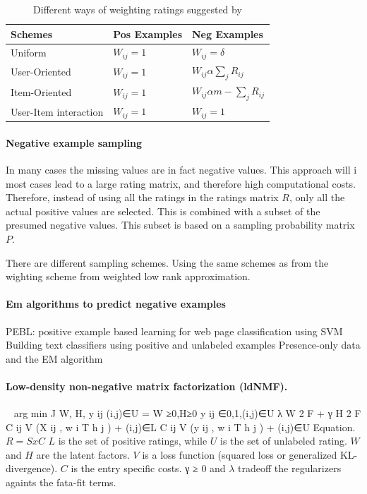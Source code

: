 \begin{table}[H]
    \centering
    \begin{tabular}{l|l|l}
      \textbf{Schemes}      & \textbf{Pos Examples} & \textbf{Neg Examples} \\ \hline
      Uniform               & $W_{ij} = 1$ & $W_{ij} = δ$ \\ \hline
      User-Oriented         & $W_{ij} = 1$ & $W_{ij} \alpha \sum_{j} R_{ij}$ \\ \hline
      Item-Oriented         & $W_{ij} = 1$ & $W_{ij} \alpha m - \sum_{j} R_{ij}$ \\ \hline
      User-Item interaction & $W_{ij} = 1$ & $W_{ij} = 1$  \\
    \end{tabular}
    \label{table:WeightingSchemes}
    \caption[Weighting Schemes]{Different ways of weighting ratings suggested by}
\end{table}

\paragraph{Negative example sampling }%
In many cases the missing values are in fact negative values.
This approach will i most cases lead to a large rating matrix, and therefore high computational costs.
Therefore, instead of using all the ratings in the ratings matrix $R$, only all the actual positive values are selected.
This is combined with a subset of the presumed negative values.
This subset is based on a sampling probability matrix $P$.

There are different sampling schemes.
Using the same schemes as from the wighting scheme from weighted low rank approximation.

\paragraph{Em algorithms to predict negative examples} %
PEBL: positive example based learning for web page classification using SVM
Building text classifiers using positive and unlabeled examples
Presence-only data and the EM algorithm

\paragraph{Low-density non-negative matrix factorization (ldNMF).}~%
arg min
J W, H, {y ij } (i,j)∈U =
W ≥0,H≥0
y ij ∈{0,1},(i,j)∈U
λ W
2
F
+ γ H
2
F
C ij V (X ij , w i T h j )
+
(i,j)∈L
C ij V (y ij , w i T h j )
+
(i,j)∈U
Equation.
$R = SxC$ %
$L$ is the set of positive ratings, while $U$ is the set of unlabeled rating.
$W$ and $H$ are the latent factors.
$V$ is a loss function (squared loss or generalized KL-divergence).
$C$ is the entry specific costs.
γ ≥ 0 and $λ$ tradeoff the regularizers againts the fata-fit terms.


